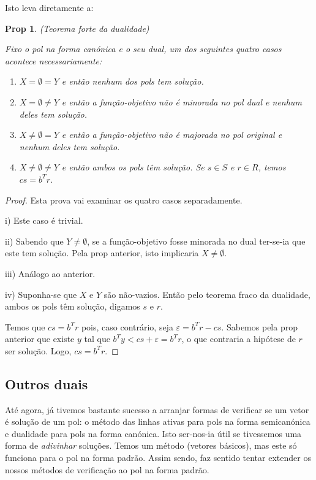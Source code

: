 \documentclass{article}
\newtheorem{prop}{Prop}
\theoremstyle{definition}
\begin{document}
	Isto leva diretamente a:
	
	\begin{prop} (Teorema forte da dualidade)
	
	Fixo o pol na forma canónica e o seu dual, um dos seguintes quatro casos acontece necessariamente:
	
	\begin{enumerate}[i]
	\item $X = \emptyset = Y$ e então nenhum dos pols tem solução.
	
	\item $X = \emptyset \neq Y$ e então a função-objetivo não é minorada no pol dual e nenhum deles tem solução.
	
	\item $X \neq \emptyset = Y$ e então a função-objetivo não é majorada no pol original e nenhum deles tem solução.
	
	\item $X \neq \emptyset \neq Y$ e então ambos os pols têm solução. Se $s \in S$ e $r \in R$, temos $cs = b^T r$.
	\end{enumerate}
	
	\end{prop}
	
	\begin{proof}
	Esta prova vai examinar os quatro casos separadamente.
	
	i) Este caso é trivial.
	
	ii) Sabendo que $Y \neq \emptyset$, se a função-objetivo fosse minorada no dual ter-se-ia que este tem solução. Pela prop anterior, isto implicaria $X \neq \emptyset$.
	
	iii) Análogo ao anterior.
	
	iv) Suponha-se que $X$ e $Y$ são não-vazios. Então pelo teorema fraco da dualidade, ambos os pols têm solução, digamos $s$ e $r$.
	
	Temos que $cs = b^T r$ pois, caso contrário, seja $\varepsilon = b^T r - cs$. Sabemos pela prop anterior que existe $y$ tal que $b^T y < cs + \varepsilon = b^T r$, o que contraria a hipótese de  $r$ ser solução. Logo, $cs = b^T r$.
	\end{proof}
	
	\subsection{Outros duais}
	
	Até agora, já tivemos bastante sucesso a arranjar formas de verificar se um vetor é solução de um pol: o método das linhas ativas para pols na forma semicanónica e dualidade para pols na forma canónica. Isto ser-nos-ia útil se tivessemos uma forma de \emph{adivinhar} soluções. Temos um método (vetores básicos), mas este só funciona para o pol na forma padrão. Assim sendo, faz sentido tentar extender os nossos métodos de verificação ao pol na forma padrão.
	
\end{document}
